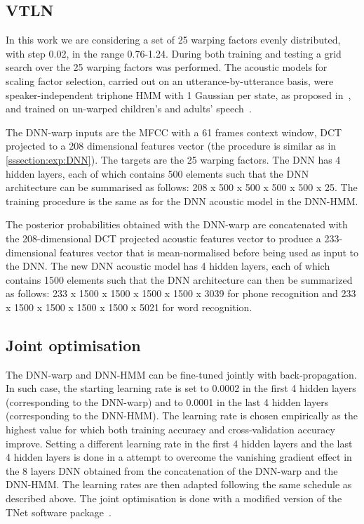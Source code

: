 \documentclass{nle}
\begin{document}
\subsection{VTLN}\label{sssection:exp:VTLN}
In  this  work  we are considering  a  set   of  25  warping   factors  evenly
distributed, with step 0.02, in the range 0.76-1.24. During both training and testing
a grid search over the 25 warping factors was performed.  The acoustic
models   for   scaling   factor    selection,   carried   out   on   an
utterance-by-utterance  basis, were speaker-independent  triphone HMM
with  1 Gaussian  per state, as proposed in~\citep{WelKanNey99},   and  trained on  un-warped children's  and
adults' speech~\citep{GerGiuBru07,GerGiuBru09}.

The DNN-warp inputs are the MFCC with a 61 frames context window, DCT
projected to a 208 dimensional features vector (the procedure is similar as in \ref{sssection:exp:DNN}). The targets are the 25
warping factors. The  DNN has 4 hidden layers,  each of which contains
500  elements such  that the  DNN  architecture can  be summarised  as
follows: 208 x 500  x 500 x 500 x 500 x  25. The training procedure is
the same as for the DNN  acoustic model in the DNN-HMM.  

The posterior
probabilities  obtained with  the  DNN-warp are concatenated with  the
208-dimensional DCT  projected acoustic  features vector to produce a
233-dimensional features  vector that is mean-normalised  before being used
as input to  the DNN. The new DNN acoustic model  has 4 hidden layers,
each of  which contains 1500  elements such that the  DNN architecture
can then be summarized  as follows: 233 x 1500 x 1500  x 1500 x 1500 x
3039 for phone recognition and 233 x 1500 x 1500  x 1500 x 1500 x 5021 for word recognition.

\subsection{Joint optimisation}\label{sssection:exp:joint}
The DNN-warp and DNN-HMM can be fine-tuned jointly with back-propagation. In such case, the starting learning rate is set to 0.0002 in the first 4 hidden layers (corresponding to the DNN-warp) and to 0.0001 in the last 4 hidden layers (corresponding to the DNN-HMM). The learning rate is chosen empirically as the highest value for which both training accuracy and cross-validation accuracy improve. Setting a different learning rate in the first 4 hidden layers and the last 4 hidden layers is done in a attempt to overcome the vanishing gradient effect in the 8 layers DNN obtained from the concatenation of the DNN-warp and the DNN-HMM. The learning rates are then adapted following the same schedule as described above. The joint optimisation is done with a modified version of the TNet software package~\citep{vesely10}.
\end{document}
